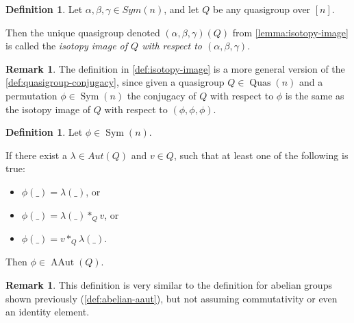 \documentclass[a4paper, 12pt, english]{article}
\theoremstyle{plain}
\theoremstyle{definition}
\newtheorem{definition}[theorem]{Definition}
\newtheorem{remark}[theorem]{Remark}
\newcommand{\tuple}[1]{ \left( #1 \right) } %
\DeclareMathOperator{\AAut}{AAut}
\DeclareMathOperator{\Sym}{Sym}
\DeclareMathOperator{\Quas}{Quas}
\begin{document}
\begin{definition} \label{def:isotopy-image}
    Let \( \alpha, \beta, \gamma \in Sym(n) \), and let \( Q \) be any quasigroup over \( [n] \).

    Then the unique quasigroup denoted \( (\alpha, \beta, \gamma)(Q) \) from \autoref{lemma:isotopy-image} is called the \emph{isotopy image of \( Q \) with respect to \( \tuple{\alpha, \beta, \gamma} \)}.
\end{definition}

\begin{remark}
    The definition in \autoref{def:isotopy-image} is a more general version of the \autoref{def:quasigroup-conjugacy}, since given a quasigroup \( Q \in \Quas(n) \) and a permutation \( \phi \in \Sym(n) \) the conjugacy of \( Q \) with respect to \( \phi \) is the same as the isotopy image of \( Q \) with respect to \( \tuple{\phi, \phi, \phi} \).
\end{remark}

\begin{definition}
    Let \( \phi \in \Sym(n) \).
    
    If there exist a \( \lambda \in Aut(Q) \) and \( v \in Q \), such that at least one of the following is true:
    \begin{itemize}
        \item \( \phi(\_) = \lambda(\_) \), or
        \item \( \phi(\_) = \lambda(\_) *_Q v \), or
        \item \( \phi(\_) = v *_Q \lambda(\_) \).
    \end{itemize}

    Then \( \phi \in \AAut(Q) \).
\end{definition}
\begin{remark}
    This definition is very similar to the definition for abelian groups shown previously (\autoref{def:abelian-aaut}), but not assuming commutativity or even an identity element.
\end{remark}
\end{document}
